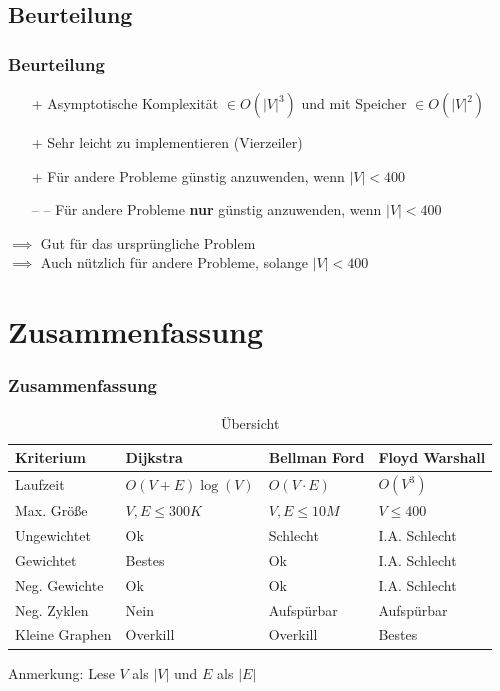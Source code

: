 
\subsection{Beurteilung} 

\begin{frame}
\frametitle{Beurteilung}
\begin{itemize}

\item[+] Asymptotische Komplexität $\in O(|V|^3)$  und mit Speicher $\in O(|V|^2)$
\item[+] Sehr leicht zu implementieren (Vierzeiler)
\item[+] Für andere Probleme günstig anzuwenden, wenn $|V|< 400$
\item[-- --] Für andere Probleme \textbf{nur} günstig anzuwenden, wenn $|V|< 400$
\end{itemize}

$\implies$ Gut für das ursprüngliche Problem\\
$\implies$ Auch nützlich für andere Probleme, solange $|V| < 400$
\end{frame}


\section{Zusammenfassung}

\begin{frame}
\frametitle{Zusammenfassung}
\small{\begin{table}
\begin{tabular}{l l l l}
\toprule
\textbf{Kriterium} & \textbf{Dijkstra} & \textbf{Bellman Ford} &\textbf{Floyd Warshall}\\
\midrule
Laufzeit & $O(V+E)\log(V)$ & $O(V \cdot E)$ & $O(V^3)$ \\
Max. Größe  & $V,E \leq 300K$ & $V,E \leq 10M$ & $V \leq 400$ \\
Ungewichtet & Ok & Schlecht & I.A. Schlecht \\
Gewichtet & Bestes & Ok & I.A. Schlecht \\
Neg. Gewichte & Ok & Ok & I.A. Schlecht \\
Neg. Zyklen & Nein & Aufspürbar & Aufspürbar \\
Kleine Graphen & Overkill & Overkill & Bestes \\
\bottomrule
\end{tabular}
\caption{Übersicht}
\end{table}}
Anmerkung: Lese $V$ als $|V|$ und $E$ als $|E|$
\end{frame}

